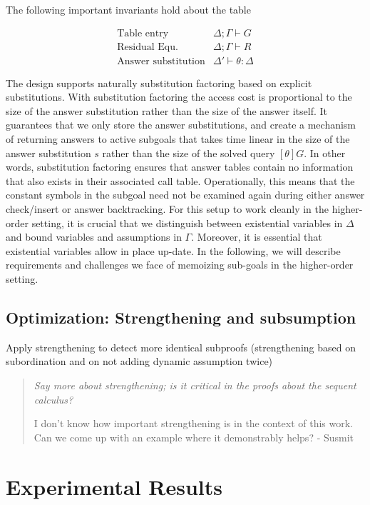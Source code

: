 \documentclass{acmconf}
\newcommand{\vd}{\vdash}
\newenvironment{note}{\begin{quote}\message{note!}\it}{\end{quote}}
\begin{document}
The following important invariants hold about the table

\[
\begin{array}{ll}
\mbox{Table entry} & \Delta ; \Gamma \vd G\\
\mbox{Residual Equ.} & \Delta ; \Gamma \vd R \\
\mbox{Answer substitution} & \Delta' \vd \theta : \Delta
\end{array}
\]

The design supports naturally substitution factoring based on explicit
substitutions\cite{RamakrishnanJLP99}. With substitution factoring the
access cost is proportional to the size of the answer substitution
rather than the size of the answer itself. It guarantees that we only
store the answer substitutions, and create a mechanism of returning
answers to active subgoals that takes time linear in the size of the
answer substitution $s$ rather than the size of the solved query
$[\theta]G$. In other words, substitution factoring ensures that answer
tables contain no information that also exists in their associated
call table. Operationally, this means that the constant symbols in the
subgoal need not be examined again during either answer check/insert
or answer backtracking. For this setup to work
cleanly in the higher-order setting, it is crucial that we distinguish
between existential variables in $\Delta$ and bound variables and
assumptions in $\Gamma$. Moreover, it is essential that existential
variables allow in place up-date.  In the following, we will describe
requirements and challenges we face of memoizing sub-goals in the
higher-order setting. 

\subsection{Optimization: Strengthening and subsumption}

Apply strengthening to detect more identical subproofs (strengthening
based on subordination and on not adding dynamic assumption twice)

\begin{note}
  Say more about strengthening; is it critical in the proofs about the
  sequent calculus?  

  I don't know how important strengthening is in the context of this work.
  Can we come up with an example where it demonstrably helps? - Susmit
\end{note}
\section{Experimental Results}
\end{document}
